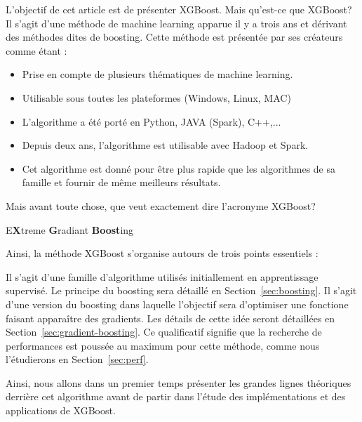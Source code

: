 L'objectif de cet article est de présenter XGBoost. Mais qu'est-ce que XGBoost? Il s'agit d'une méthode de machine learning apparue il y a trois ans et dérivant des méthodes dites de boosting. Cette méthode est présentée par ses créateurs comme étant :
\begin{itemize}
	\item[\thColor{\faFlag~~Flexible}]Prise en compte de plusieurs thématiques de machine learning.
	\item[\thColor{\faCube~~Portable}]Utilisable sous toutes les plateformes (Windows, Linux, MAC)
	\item[\thColor{\faCommentsO~~Multi-langages}]L'algorithme a été porté en Python, JAVA (Spark), C++,...
	\item[\thColor{\faCloud~~Distribuée}]Depuis deux ans, l'algorithme est utilisable avec Hadoop et Spark.
	\item[\thColor{\faRocket~~Perfomante}]Cet algorithme est donné pour être plus rapide que les algorithmes de sa famille et fournir de même meilleurs résultats.
\end{itemize}
Mais avant toute chose, que veut exactement dire l'acronyme \og XGBoost\fg?
\begin{center}
E\textbf{\textcolor{bluenight}{X}}treme \textbf{\textcolor{bluenight}{G}}radiant \textbf{\textcolor{bluenight}{Boost}}ing
\end{center}
Ainsi, la méthode XGBoost s'organise autours de trois points essentiels :
\begin{itemize}
	Il s'agit d'une famille d'algorithme utilisés initiallement en apprentissage supervisé. Le principe du boosting sera détaillé en Section~\ref{sec:boosting}.
	Il s'agit d'une version du boosting dans laquelle l'objectif sera d'optimiser une fonctione faisant apparaître des gradients. Les détails de cette idée seront détaillées en Section~\ref{sec:gradient-boosting}.
	Ce qualificatif signifie que la recherche de performances est poussée au maximum pour cette méthode, comme nous l'étudierons en Section~\ref{sec:perf}.
\end{itemize}
Ainsi, nous allons dans un premier temps présenter les grandes lignes théoriques derrière cet algorithme avant de partir dans l'étude des implémentations et des applications de XGBoost.
